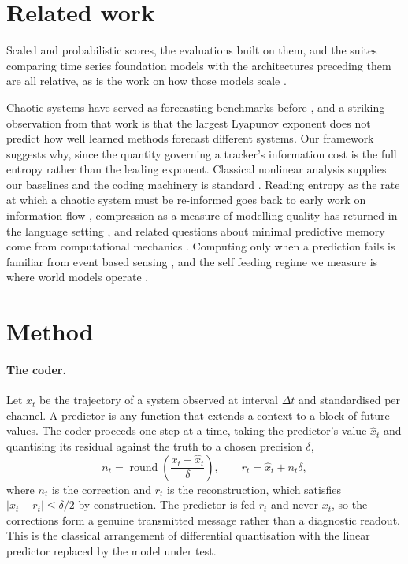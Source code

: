 \documentclass{article}
\begin{document}
\section{Related work}

Scaled and probabilistic scores, the evaluations built on them, and the suites comparing time series foundation models with the architectures preceding them are all relative, as is the work on how those models scale \citep{hyndman2006, gneiting2007, makridakis2020m4, godahewa2021monash, aksu2024gifteval, ansari2024chronos, woo2024moirai, das2024timesfm, kaplan2020, edwards2024scaling}.

Chaotic systems have served as forecasting benchmarks before \citep{gilpin2021chaos, gilpin2023scale}, and a striking observation from that work is that the largest Lyapunov exponent does not predict how well learned methods forecast different systems. Our framework suggests why, since the quantity governing a tracker's information cost is the full entropy rather than the leading exponent. Classical nonlinear analysis supplies our baselines \citep{takens1981, farmer1987, kantz2004} and the coding machinery is standard \citep{shannon1948, jayant1984, krichevsky1981}. Reading entropy as the rate at which a chaotic system must be re-informed goes back to early work on information flow \citep{shaw1981, grassberger1986}, compression as a measure of modelling quality has returned in the language setting \citep{deletang2024compression}, and related questions about minimal predictive memory come from computational mechanics \citep{crutchfield1989, shalizi2001}. Computing only when a prediction fails is familiar from event based sensing \citep{lichtsteiner2008, gallego2022}, and the self feeding regime we measure is where world models operate \citep{ha2018world, hafner2023dreamerv3, lecun2022path}.

\section{Method}

\paragraph{The coder.}
Let $x_t$ be the trajectory of a system observed at interval $\Delta t$ and standardised per channel. A predictor is any function that extends a context to a block of future values. The coder proceeds one step at a time, taking the predictor's value $\hat{x}_t$ and quantising its residual against the truth to a chosen precision $\delta$,
\begin{equation}
n_t = \operatorname{round}\!\left(\frac{x_t - \hat{x}_t}{\delta}\right),
\qquad
r_t = \hat{x}_t + n_t \delta ,
\end{equation}
where $n_t$ is the correction and $r_t$ is the reconstruction, which satisfies $|x_t - r_t| \le \delta/2$ by construction. The predictor is fed $r_t$ and never $x_t$, so the corrections form a genuine transmitted message rather than a diagnostic readout. This is the classical arrangement of differential quantisation \citep{jayant1984} with the linear predictor replaced by the model under test.
\end{document}
